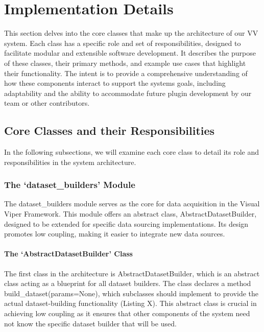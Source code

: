 \documentclass[
]{article}
\author{}
\date{}
\begin{document}
\section{Implementation Details}\label{implementation-details}

This section delves into the core classes that make up the architecture
of our VV system. Each class has a specific role and set of
responsibilities, designed to facilitate modular and extensible software
development. It describes the purpose of these classes, their primary
methods, and example use cases that highlight their functionality. The
intent is to provide a comprehensive understanding of how these
components interact to support the system\textquotesingle s goals,
including adaptability and the ability to accommodate future plugin
development by our team or other contributors.

\subsection{Core Classes and their
Responsibilities}\label{core-classes-and-their-responsibilities}

In the following subsections, we will examine each core class to detail
its role and responsibilities in the system architecture.

\subsubsection{The `dataset\_builders'
Module}\label{the-dataset_builders-module}

The dataset\_builders module serves as the core for data acquisition in
the Visual Viper Framework. This module offers an abstract class,
AbstractDatasetBuilder, designed to be extended for specific data
sourcing implementations. Its design promotes low coupling, making it
easier to integrate new data sources.

\paragraph{The `AbstractDatasetBuilder'
Class}\label{the-abstractdatasetbuilder-class}

The first class in the architecture is AbstractDatasetBuilder, which is
an abstract class acting as a blueprint for all dataset builders. The
class declares a method build\_dataset(params=None), which subclasses
should implement to provide the actual dataset-building functionality
(Listing X). This abstract class is crucial in achieving low coupling as
it ensures that other components of the system need not know the
specific dataset builder that will be used.
\end{document}
